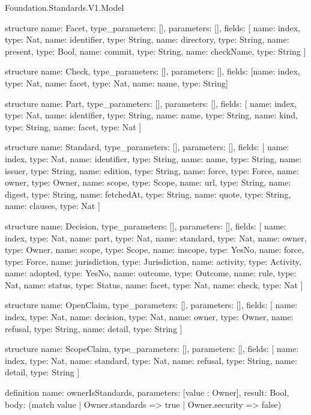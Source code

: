 \begin{lexlean}{Foundation.Standards.V1.Model}
\begin{semanticmodule}
structure{
  name: Facet,
  type_parameters: [],
  parameters: [],
  fields: [
    {name: index, type: Nat},
    {name: identifier, type: String},
    {name: directory, type: String},
    {name: present, type: Bool},
    {name: commit, type: String},
    {name: checkName, type: String}
  ]
}

structure{
  name: Check,
  type_parameters: [],
  parameters: [],
  fields: [{name: index, type: Nat}, {name: facet, type: Nat}, {name: name, type: String}]
}

structure{
  name: Part,
  type_parameters: [],
  parameters: [],
  fields: [
    {name: index, type: Nat},
    {name: identifier, type: String},
    {name: name, type: String},
    {name: kind, type: String},
    {name: facet, type: Nat}
  ]
}

structure{
  name: Standard,
  type_parameters: [],
  parameters: [],
  fields: [
    {name: index, type: Nat},
    {name: identifier, type: String},
    {name: name, type: String},
    {name: issuer, type: String},
    {name: edition, type: String},
    {name: force, type: Force},
    {name: owner, type: Owner},
    {name: scope, type: Scope},
    {name: url, type: String},
    {name: digest, type: String},
    {name: fetchedAt, type: String},
    {name: quote, type: String},
    {name: clauses, type: Nat}
  ]
}

structure{
  name: Decision,
  type_parameters: [],
  parameters: [],
  fields: [
    {name: index, type: Nat},
    {name: part, type: Nat},
    {name: standard, type: Nat},
    {name: owner, type: Owner},
    {name: scope, type: Scope},
    {name: inscope, type: YesNo},
    {name: force, type: Force},
    {name: jurisdiction, type: Jurisdiction},
    {name: activity, type: Activity},
    {name: adopted, type: YesNo},
    {name: outcome, type: Outcome},
    {name: rule, type: Nat},
    {name: status, type: Status},
    {name: facet, type: Nat},
    {name: check, type: Nat}
  ]
}

structure{
  name: OpenClaim,
  type_parameters: [],
  parameters: [],
  fields: [
    {name: index, type: Nat},
    {name: decision, type: Nat},
    {name: owner, type: Owner},
    {name: refusal, type: String},
    {name: detail, type: String}
  ]
}

structure{
  name: ScopeClaim,
  type_parameters: [],
  parameters: [],
  fields: [
    {name: index, type: Nat},
    {name: standard, type: Nat},
    {name: refusal, type: String},
    {name: detail, type: String}
  ]
}

definition{
  name: ownerIsStandards,
  parameters: [value : Owner],
  result: Bool,
  body: (match value | Owner.standards => true | Owner.security => false)
}


\end{semanticmodule}
\end{lexlean}

